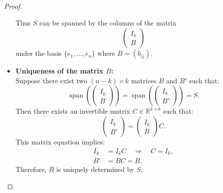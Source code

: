\begin{problem}
\begin{proof}
\begin{itemize}
          Thus $S$ can be spanned by the columns of the matrix
          $$\begin{pmatrix}
            I_k\\ B
          \end{pmatrix}$$
          under the basis $\{e_1, \dots, e_n\}$ where $B = (b_{ij})$.
          \item \textbf{Uniqueness of the matrix $B$:} \\
          Suppose there exist two $(n-k) \times k$ matrices $B$ and $B'$ such that:
          \begin{equation*}
            \operatorname{span}\left(
              \begin{pmatrix} I_k \\ B \end{pmatrix}
              \right) = \operatorname{span}\left(
              \begin{pmatrix} I_k \\ B' \end{pmatrix}
              \right) = S.
          \end{equation*}
          Then there exists an invertible matrix $C \in \mathbb{R}^{k \times k}$ such that:     
          \begin{equation*}
            \begin{pmatrix} I_k \\ B' \end{pmatrix}
            = 
           \begin{pmatrix} I_k \\ B \end{pmatrix}
            C.
          \end{equation*}
          This matrix equation implies:
          \begin{align*}
            I_k &= I_k C \quad \Rightarrow \quad C = I_k, \\
            B' &= B C = B.
          \end{align*}
          Therefore, $B$ is uniquely determined by $S$.
      \end{itemize}
    \end{proof}
\end{problem}

